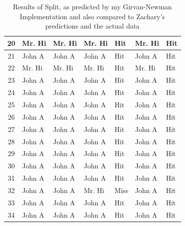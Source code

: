 \begin{table}
\begin{tabular}{ | c | p{2cm} | p{2cm} | p{2cm} | p{2cm} | p{2cm} | p{2cm} |}
\hline
20 & Mr. Hi & Mr. Hi & Mr. Hi & Hit & Mr. Hi & Hit\\
\hline
21 & John A & John A & John A & Hit & John A & Hit\\
\hline
22 & Mr. Hi & Mr. Hi & Mr. Hi & Hit & Mr. Hi & Hit\\
\hline
23 & John A & John A & John A & Hit & John A & Hit\\
\hline
24 & John A & John A & John A & Hit & John A & Hit\\
\hline
25 & John A & John A & John A & Hit & John A & Hit\\
\hline
26 & John A & John A & John A & Hit & John A & Hit\\
\hline
27 & John A & John A & John A & Hit & John A & Hit\\
\hline
28 & John A & John A & John A & Hit & John A & Hit\\
\hline
29 & John A & John A & John A & Hit & John A & Hit\\
\hline
30 & John A & John A & John A & Hit & John A & Hit\\
\hline
31 & John A & John A & John A & Hit & John A & Hit\\
\hline
32 & John A & John A & Mr. Hi & Miss & John A & Hit\\
\hline
33 & John A & John A & John A & Hit & John A & Hit\\
\hline
34 & John A & John A & John A & Hit & John A & Hit\\
\hline
\end{tabular}
\caption{Results of Split, as predicted by my Girvan-Newman Implementation and also compared to Zachary's predictions and the actual data}
\label{tab:results}
\end{table}



\newpage


